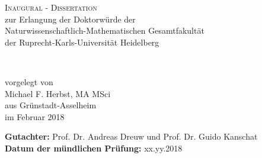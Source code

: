 \begin{titlepage}
\begin{center}

	\Huge \textsc{Inaugural - Dissertation} \\[0.4cm]
	{\Large zur Erlangung der Doktorwürde der \\
	Naturwissenschaftlich-Mathematischen Gesamtfakultät \\
	der Ruprecht-Karls-Universität Heidelberg\\
	}

	\vfill

	{\Huge
	\textbf{\thesistitle}\\
	\vspace{0.5cm}
	\LARGE \thesissubtitle
	}

	\vfill

	{\large  vorgelegt von} \\
	\vspace{1.0cm}
	{\LARGE Michael F. Herbst, {\large \mbox{MA} \mbox{MSci}} }\\[-0.3em]
	{\large aus Grünstadt-Asselheim } \\
	\vspace{1.0cm}
	{\large im Februar 2018} \\

	\vspace{2cm}

	\begin{flushleft}
	\normalsize
		\textbf{Gutachter:} \qquad Prof. Dr. Andreas Dreuw \hfill und \hfill Prof. Dr. Guido Kanschat\\
		\textbf{Datum der mündlichen Prüfung:} \qquad xx.yy.2018
	\end{flushleft}
\end{center}
\end{titlepage}
